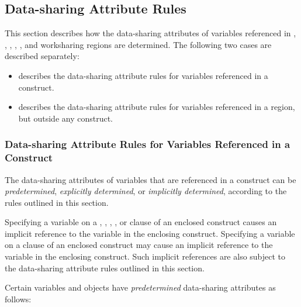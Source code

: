 \subsection{Data-sharing Attribute Rules}
\label{subsec:Data-sharing Attribute Rules}
This section describes how the data-sharing attributes of variables referenced in 
, , , , , and worksharing regions are determined. The following two cases are described separately:

\begin{itemize}
\item {} 
describes the data-sharing attribute rules for variables 
referenced in a construct.

\item {} describes the data-sharing attribute rules for variables 
referenced in a region, but outside any construct. 
\end{itemize}









\subsubsection{Data-sharing Attribute Rules for Variables Referenced in a Construct}
\label{subsubsec:Data-sharing Attribute Rules for Variables Referenced in a Construct}
The data-sharing attributes of variables that are referenced in a construct can be 
\emph{predetermined}, \emph{explicitly determined}, or \emph{implicitly determined}, according to the rules 
outlined in this section.

Specifying a variable on a , , , , 
or  clause of an enclosed construct causes an implicit reference to the 
variable in the enclosing construct. Specifying a variable on a  clause of an enclosed 
construct may cause an implicit reference to the variable in the enclosing construct. 
Such implicit references are also subject to the data-sharing attribute rules outlined in 
this section.

Certain variables and objects have \emph{predetermined} data-sharing attributes as follows:

